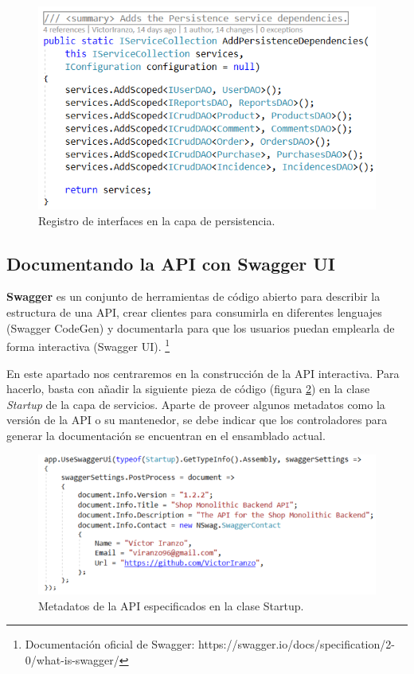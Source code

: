 \documentclass[11pt,spanish,listoffigures]{tfgetsinf}
\begin{document}
\begin{figure}[h]
\centering
\includegraphics[scale=0.9]{ResolucionDependencias}
\caption{Registro de interfaces en la capa de persistencia.}
\label{fig:ResolucionDependencias}
\end{figure}

\subsection{Documentando la API con Swagger UI}

\textbf{Swagger} es un conjunto de herramientas de código abierto para describir la estructura de una API, crear clientes para consumirla en diferentes lenguajes (Swagger CodeGen) y documentarla para que los usuarios puedan emplearla de forma interactiva (Swagger UI). \footnote{ Documentación oficial de Swagger: https://swagger.io/docs/specification/2-0/what-is-swagger/}

En este apartado nos centraremos en la construcción de la API interactiva. Para hacerlo, basta con añadir la siguiente pieza de código (figura \ref{fig:SwaggerUI}) en la clase \textit{Startup} de la capa de servicios. Aparte de proveer algunos metadatos como la versión de la API o su mantenedor, se debe indicar que los controladores para generar la documentación se encuentran en el ensamblado actual.

\begin{figure}[h]
\centering
\includegraphics[scale=0.9]{SwaggerUI}
\caption{Metadatos de la API especificados en la clase Startup.}
\label{fig:SwaggerUI}
\end{figure}
\end{document}
